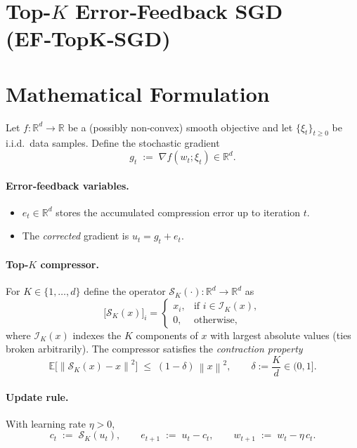 \documentclass{article}
\newcommand{\E}{\mathbb{E}}
\newcommand{\R}{\mathbb{R}}
\newcommand{\norm}[1]{\left\|#1\right\|}
\newcommand{\topk}[1]{\mathcal{S}_K\!\left(#1\right)}
\begin{document}
\section*{Top-$K$ Error‑Feedback SGD (EF‑TopK‑SGD)}

\section*{Mathematical Formulation}
Let $f:\R^d\rightarrow\R$ be a (possibly non‑convex) smooth objective and let $\{\xi_t\}_{t\ge 0}$ be i.i.d.\ data samples.  
Define the stochastic gradient
\[
g_t \;:=\; \nabla f(w_t;\xi_t)\in\R^d .
\]

\paragraph{Error‑feedback variables.}
\begin{itemize}
    \item $e_t\in\R^d$ stores the accumulated compression error up to iteration $t$.
    \item The \emph{corrected} gradient is $u_t = g_t+e_t$.
\end{itemize}

\paragraph{Top‑$K$ compressor.}
For $K\in\{1,\dots,d\}$ define the operator $\topk{\cdot}:\R^d\to\R^d$ as
\[
\bigl[\topk{x}\bigr]_i=
\begin{cases}
x_i, & \text{if } i\in\mathcal{I}_K(x),\\[4pt]
0,   & \text{otherwise},
\end{cases}
\]
where $\mathcal{I}_K(x)$ indexes the $K$ components of $x$ with largest absolute values (ties broken arbitrarily).  
The compressor satisfies the \emph{contraction property}
\[
\label{eq:contraction}
\E\!\bigl[\norm{\topk{x}-x}^2\bigr]\;\le\;(1-\delta)\,\norm{x}^2,\qquad 
\delta:=\frac{K}{d}\in(0,1].
\tag{C}
\]

\paragraph{Update rule.}
With learning rate $\eta>0$,
\[
c_t \;:=\; \topk{u_t},\qquad 
e_{t+1}\;:=\;u_t-c_t,\qquad 
w_{t+1}\;:=\;w_t-\eta\,c_t .
\tag{1}
\]
\end{document}
